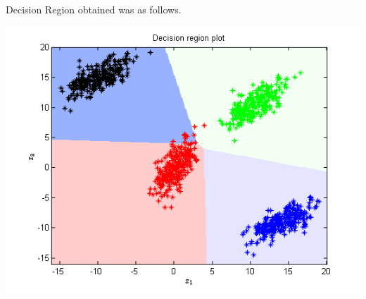 \documentclass{article}
\begin{document}
Decision Region obtained was as follows.
\begin{center}
\includegraphics[scale=1]{Classification/1a/c_linear/dec}
\end{center}
\end{document}
